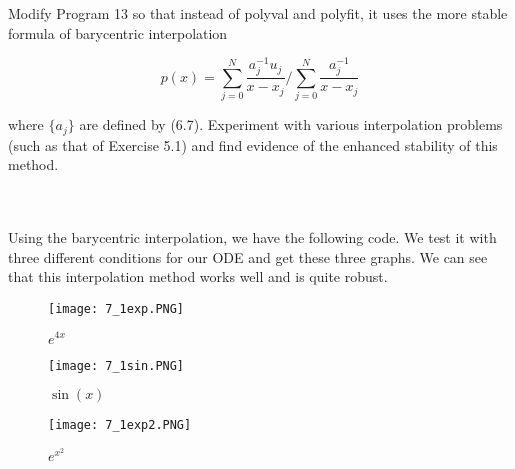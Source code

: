 Modify Program 13 so that instead of polyval and polyfit, it uses the more stable formula of barycentric
interpolation

$$p(x)=\sum_{j=0}^N\frac{a_j^{-1}u_j}{x-x_j}/\sum_{j=0}^N\frac{a_j^{-1}}{x-x_j}$$

where $\{a_j\}$ are defined by (6.7). Experiment with various interpolation problems (such as that of
Exercise 5.1) and find evidence of the enhanced stability of this method.\\\\

\begin{solution}\renewcommand{\qedsymbol}{}\ \\
    Using the barycentric interpolation, we have the following code. We test it with three different
    conditions for our ODE and get these three graphs. We can see that this interpolation method works
    well and is quite robust.

    \begin{figure}[htp]
        \centering
        \texttt{[image: 7\_1exp.PNG]}
        \caption{$e^{4x}$}
    \end{figure}
    \begin{figure}[htp]
        \centering
        \texttt{[image: 7\_1sin.PNG]}
        \caption{$\sin(x)$}
    \end{figure}
    \begin{figure}[htp]
        \centering
        \texttt{[image: 7\_1exp2.PNG]}
        \caption{$e^{x^2}$}
    \end{figure}

\end{solution}

\newpage

\newpage